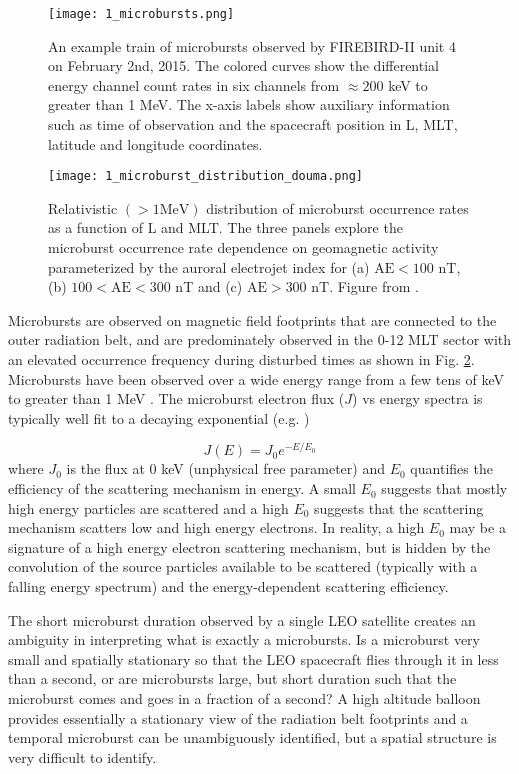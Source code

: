 \begin{figure}
\texttt{[image: 1\_microbursts.png]}
\caption{An example train of microbursts observed by FIREBIRD-II unit 4 on February 2nd, 2015. The colored curves show the differential energy channel count rates in six channels from $\approx 200$ keV to greater than 1 MeV. The x-axis labels show auxiliary information such as time of observation and the spacecraft position in L, MLT, latitude and longitude coordinates.}
\label{Intro:microbursts}
\end{figure}

\begin{figure}
\texttt{[image: 1\_microburst\_distribution\_douma.png]}
\caption{Relativistic $(> 1 \mathrm{MeV})$ distribution of microburst occurrence rates as a function of L and MLT. The three panels explore the microburst occurrence rate dependence on geomagnetic activity parameterized by the auroral electrojet index for (a) $\mathrm{AE} < 100$ nT, (b) $100 < \mathrm{AE} < 300$ nT and (c) $\mathrm{AE} > 300$ nT. Figure from \citet{Douma2017}.}
\label{Intro:microburst_distribution}
\end{figure}

Microbursts are observed on magnetic field footprints that are connected to the outer radiation belt, and are predominately observed in the 0-12 MLT sector with an elevated occurrence frequency during disturbed times as shown in Fig. \ref{Intro:microburst_distribution}. Microbursts have been observed over a wide energy range from a few tens of keV \citep{Datta1997} to greater than 1 MeV \citep[e.g.][]{Blake1996, Greeley2019}. The microburst electron flux ($J$) vs energy spectra is typically well fit to a decaying exponential (e.g. \citep{Parks1967, Lee2005})

\begin{equation}
J(E) = J_0 e^{-E/E_0}
\end{equation} where $J_0$ is the flux at 0 keV (unphysical free parameter) and $E_0$ quantifies the efficiency of the scattering mechanism in energy. A small $E_0$ suggests that mostly high energy particles are scattered and a high $E_0$ suggests that the scattering mechanism scatters low and high energy electrons. In reality, a high $E_0$ may be a signature of a high energy electron scattering mechanism, but is hidden by the convolution of the source particles available to be scattered (typically with a falling energy spectrum) and the energy-dependent scattering efficiency.

The short microburst duration observed by a single LEO satellite creates an ambiguity in interpreting what is exactly a microbursts. Is a microburst very small and spatially stationary so that the LEO spacecraft flies through it in less than a second, or are microbursts large, but short duration such that the microburst comes and goes in a fraction of a second? A high altitude balloon provides essentially a stationary view of the radiation belt footprints and a temporal microburst can be unambiguously identified, but a spatial structure is very difficult to identify.


